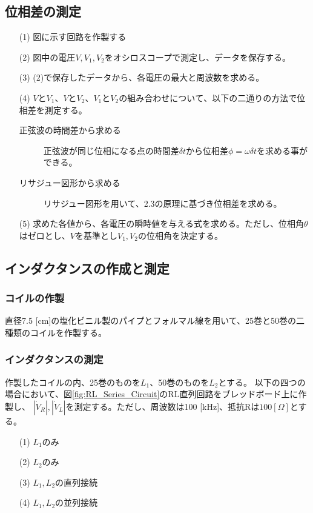 \documentclass[dvipdfmx]{jsarticle}
\begin{document}
\subsection{位相差の測定}
\begin{itemize}
  \item [(1)]図に示す回路を作製する
  \item [(2)]図中の電圧$V, V_1, V_2$をオシロスコープで測定し、データを保存する。
  \item [(3)](2)で保存したデータから、各電圧の最大と周波数を求める。
  \item [(4)]$VとV_1、VとV_2、V_1とV_2の組み合わせについて$、以下の二通りの方法で位相差を測定する。
    \begin{description}
      \item [正弦波の時間差から求める]正弦波が同じ位相になる点の時間差$\delta t$から位相差$\phi = \omega \delta t$を求める事ができる。
      \item [リサジュー図形から求める]リサジュー図形を用いて、2.3の原理に基づき位相差を求める。
    \end{description}
  \item[(5)]求めた各値から、各電圧の瞬時値を与える式を求める。ただし、位相角$\theta$はゼロとし、$V$を基準とし$V_1, V_2$の位相角を決定する。
\end{itemize}
\subsection{インダクタンスの作成と測定}
\subsubsection{コイルの作製}
直径7.5 [cm]の塩化ビニル製のパイプとフォルマル線を用いて、25巻と50巻の二種類のコイルを作製する。
\subsubsection{インダクタンスの測定}
作製したコイルの内、25巻のものを$L_1$、50巻のものを$L_2$とする。
以下の四つの場合において、図\ref{fig:RL_Series_Circuit}のRL直列回路をブレッドボード上に作製し、
$|\dot V_R|, |\dot V_L|$を測定する。ただし、周波数は100 [kHz]、抵抗Rは$100 [\Omega]$とする。
\begin{itemize}
  \item [(1)]$L_1$のみ
  \item [(2)]$L_2$のみ
  \item [(3)]$L_1, L_2$の直列接続
  \item [(4)]$L_1, L_2$の並列接続
\end{itemize}
\end{document}
